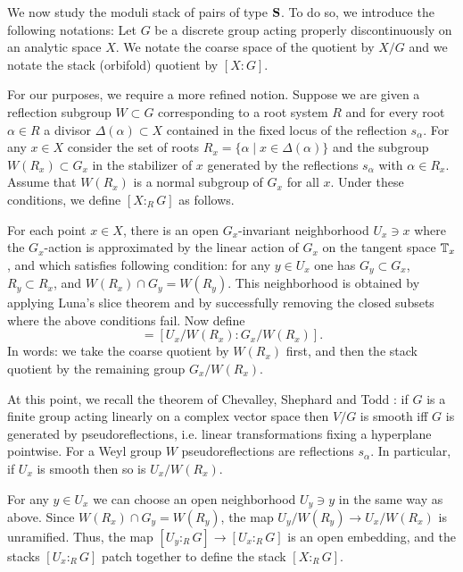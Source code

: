 \documentclass[table,x11names]{amsart}
\begin{document}
 
 \begin{notation}\label{not:R-quotient}
   We now study the moduli stack of pairs of type ${\bf S}$. To do so,
 we introduce the following notations: Let $G$ be a discrete group acting properly
 discontinuously on an analytic space $X$. We notate the coarse space of the quotient by $X/G$
 and we notate the stack (orbifold) quotient by $[X:G]$.
 
 For our purposes, we require a more refined notion. Suppose we are
 given a reflection subgroup $W\subset G$ corresponding to a root
 system $R$ and for every root $\alpha\in R$ a divisor
 $\Delta(\alpha)\subset X$ contained in the fixed locus of the
 reflection $s_\alpha$. For any $x\in X$ consider the set of roots
 $R_x = \{\alpha \mid x\in\Delta(\alpha) \}$ and the subgroup
 $W(R_x)\subset G_x$ in the stabilizer of $x$ generated by the
 reflections $s_\alpha$ with $\alpha\in R_x$. Assume that $W(R_x)$ is
 a normal subgroup of $G_x$ for all $x$.  Under these conditions, we
 define $[X:_R G]$ as follows.

 For each point $x\in X$, there is an open $G_x$-invariant
 neighborhood $U_x\ni x$ where the $G_x$-action is approximated by the
 linear action of $G_x$ on the tangent space ${\mathbb T}_x$, and 
 which satisfies following condition: for any
 $y\in U_x$ one has $G_y\subset G_x$, $R_y\subset R_x$, and
 $W(R_x)\cap G_y = W(R_y)$. This neighborhood is obtained by
 applying Luna's slice theorem and by 
 successfully removing the closed subsets where the above conditions
 fail. Now define
 \begin{displaymath}
   [U_x:_RG] =[U_x/W(R_x):G_x/W(R_x)].   
 \end{displaymath}
In words: we take the coarse quotient by $W(R_x)$ first, and then the
stack quotient by the remaining group $G_x/W(R_x)$.

At this point, we recall the theorem of Chevalley, Shephard and Todd
\cite{chevalley1955invariants-of-finite, shephard1954finite-unitary}:
if $G$ is a finite group acting linearly on a complex vector space
then $V/G$ is smooth iff $G$ is generated by pseudoreflections, i.e. linear
transformations fixing a hyperplane pointwise. For a Weyl group $W$
pseudoreflections are reflections $s_\alpha$. In particular, 
if $U_x$ is smooth then so is $U_x/W(R_x)$.
 
 For any $y\in U_x$ we can choose an open neighborhood $U_y\ni y$ in
 the same way as above.
 Since $W(R_x)\cap G_y = W(R_y)$, the
 map $U_y/W(R_y) \to U_x/W(R_x)$ is unramified. Thus, the map
 $[U_y:_RG] \to [U_x:_RG]$ is an open embedding, and the stacks
 $[U_x:_RG]$ patch together to define the stack $[X:_RG]$.


\end{notation}
\end{document}

